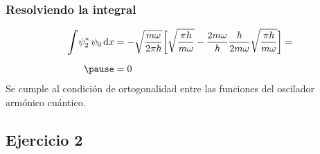 \documentclass[12pt]{beamer}
\begin{document}
\begin{frame}
\frametitle{Resolviendo la integral}
\begin{eqnarray*}
\begin{aligned}
\scaleint{6ex} \psi_{2}^{*} \, \psi_{0} \dd{x} &= - \sqrt{\dfrac{m \omega}{2 \pi \hbar}} \bigg[ \sqrt{\dfrac{\pi \hbar}{m \omega}} - \dfrac{2 m \omega}{\hbar} \dfrac{\hbar}{2 m \omega} \sqrt{\dfrac{\pi \hbar}{m \omega}} \bigg] = \\[0.5em] \pause
&= 0
\end{aligned}
\end{eqnarray*}
\pause
Se cumple al condición de ortogonalidad entre las funciones del oscilador armónico cuántico.
\end{frame}

\subsection{Ejercicio 2}
\end{document}
